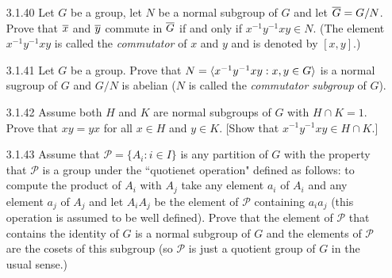 \begin{enumerate}
   \item[3.1.40]  Let $G$ be a group, let $N$ be a normal subgroup of $G$ and
                  let $\overline{G} = G/N$. Prove that $\overline{x}$ and $\overline{y}$ commute in
                  $\overline{G}$ if and only if $x^{-1}y^{-1}xy \in N$. (The element
                  $x^{-1}y^{-1}xy$ is called the \textit{commutator} of $x$ and
                  $y$ and is denoted by $[x, y]$.)
   \item[3.1.41]  Let $G$ be a group. Prove that
                  $N = \langle x^{-1}y^{-1}xy : x, y \in G \rangle$ is a normal sugroup of
                  $G$ and $G/N$ is abelian ($N$ is called the
                  \textit{commutator subgroup} of $G$).
   \item[3.1.42]  Assume both $H$ and $K$ are normal subgroups of $G$ with
                  $H \cap K = 1$. Prove that $xy = yx$ for all $x \in H$ and
                  $y \in K$. [Show that $x^{-1}y^{-1}xy \in H \cap K$.]
   \item[3.1.43]  Assume that $\mathcal{P} = \{A_i : i \in I\}$ is any partition
                  of $G$ with the property that $\mathcal{P}$ is a group under
                  the ``quotienet operation" defined as follows: to compute the
                  product of $A_i$ with $A_j$ take any element $a_i$ of $A_i$
                  and any element $a_j$ of $A_j$ and let $A_iA_j$ be the element
                  of $\mathcal{P}$ containing $a_ia_j$ (this operation is
                  assumed to be well defined). Prove that the element of
                  $\mathcal{P}$ that contains the identity of $G$ is a normal
                  subgroup of $G$ and the elements of $\mathcal{P}$ are the
                  cosets of this subgroup (so $\mathcal{P}$ is just a quotient
                  group of $G$ in the usual sense.)
\end{enumerate}
